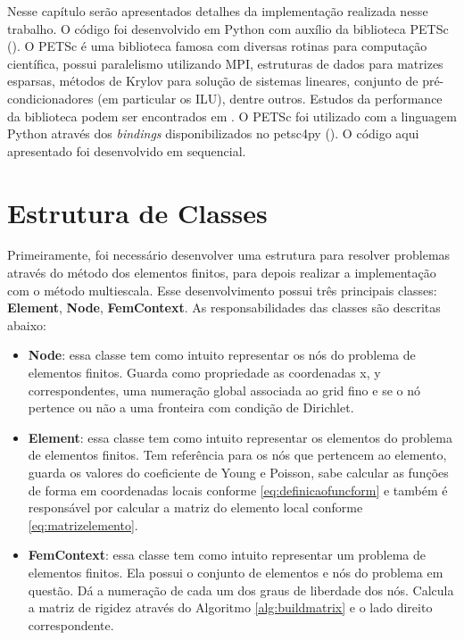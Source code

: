 Nesse capítulo serão apresentados detalhes da implementação realizada nesse trabalho. O código foi desenvolvido em Python com auxílio da biblioteca PETSc (\citet{petsc-user-ref}). O PETSc é uma biblioteca famosa com diversas rotinas para computação científica, possui paralelismo utilizando MPI, estruturas de dados para matrizes esparsas, métodos de Krylov para solução de sistemas lineares, conjunto de pré-condicionadores (em particular os ILU), dentre outros. Estudos da performance da biblioteca podem ser encontrados em \citet{petsc-efficient}. O PETSc foi utilizado com a linguagem Python através dos \textit{bindings} disponibilizados no petsc4py (\citet{Dalcin2011}). O código aqui apresentado foi desenvolvido em sequencial. 


\section{Estrutura de Classes}

Primeiramente, foi necessário desenvolver uma estrutura para resolver problemas através do método dos elementos finitos, para depois realizar a implementação com o método multiescala. Esse desenvolvimento possui três principais classes: \textbf{Element}, \textbf{Node}, \textbf{FemContext}. As responsabilidades das classes são descritas abaixo:

\begin{itemize}
    \item \textbf{Node}: essa classe tem como intuito representar os nós do problema de elementos finitos. Guarda como propriedade as coordenadas x, y correspondentes, uma numeração global associada ao grid fino e se o nó pertence ou não a uma fronteira com condição de Dirichlet.
    \item \textbf{Element}: essa classe tem como intuito representar os elementos do problema de elementos finitos. Tem referência para os nós que pertencem ao elemento, guarda os valores do coeficiente de Young e Poisson, sabe calcular as funções de forma em coordenadas locais conforme \eqref{eq:definicaofuncform} e também é responsável por calcular a matriz do elemento local conforme \eqref{eq:matrizelemento}.
    \item \textbf{FemContext}: essa classe tem como intuito representar um problema de elementos finitos. Ela possui o conjunto de elementos e nós do problema em questão. Dá a numeração de cada um dos graus de liberdade dos nós. Calcula a matriz de rigidez através do Algoritmo \ref{alg:buildmatrix} e o lado direito correspondente. 
\end{itemize}

